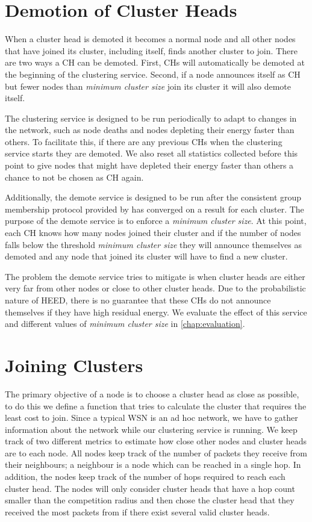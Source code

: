 \section{Demotion of Cluster Heads}
\label{sec:demoting-cluster-heads}
When a cluster head is demoted it becomes a normal node and all other nodes that have joined its cluster, including itself, finds another cluster to join. There are two ways a CH can be demoted.  First, CHs will automatically be demoted at the beginning of the clustering service. Second, if a node announces itself as CH but fewer nodes than \emph{minimum cluster size} join its cluster it will also demote itself.

The clustering service is designed to be run periodically to adapt to changes in the network, such as node deaths and nodes depleting their energy faster than others. To facilitate this, if there are any previous CHs when the clustering service starts they are demoted. We also reset all statistics collected before this point to give nodes that might have depleted their energy faster than others a chance to not be chosen as CH again.  

Additionally, the demote service is designed to be run after the consistent group membership protocol provided by \atwo{} \cite{a2-introduction-paper} has converged on a result for each cluster. The purpose of the demote service is to enforce a \emph{minimum cluster size}. At this point, each CH knows how many nodes joined their cluster and if the number of nodes falls below the threshold \emph{minimum cluster size} they will announce themselves as demoted and any node that joined its cluster will have to find a new cluster.

The problem the demote service tries to mitigate is when cluster heads are either very far from other nodes or close to other cluster heads. Due to the probabilistic nature of HEED, there is no guarantee that these CHs do not announce themselves if they have high residual energy. We evaluate the effect of this service and different values of \emph{minimum cluster size} in \cref{chap:evaluation}.


\section{Joining Clusters}
The primary objective of a node is to choose a cluster head as close as possible, to do this we define a function that tries to calculate the cluster that requires the least cost to join. Since a typical WSN is an ad hoc network, we have to gather information about the network while our clustering service is running. We keep track of two different metrics to estimate how close other nodes and cluster heads are to each node. All nodes keep track of the number of packets they receive from their neighbours; a neighbour is a node which can be reached in a single hop. In addition, the nodes keep track of the number of hops required to reach each cluster head. The nodes will only consider cluster heads that have a hop count smaller than the competition radius and then chose the cluster head that they received the most packets from if there exist several valid cluster heads.


